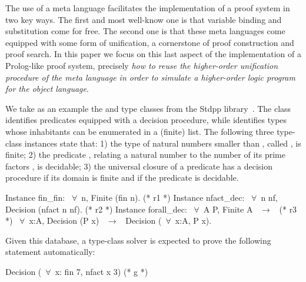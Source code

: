 \documentclass[sigconf,natbib=false,review]{acmart}
\begin{document}
The use of a meta language facilitates the implementation of a
proof system in two key ways. The first and most well-know one is that variable binding and
substitution come for free. %
The second one is that these meta languages come equipped with some form
of unification, a cornerstone of proof construction and proof search.
In this paper we focus on this last aspect of the implementation of
a Prolog-like proof system, precisely \emph{how to reuse the higher-order
unification procedure of the meta language in order to simulate a
higher-order logic program for the object language}.

We take as an example the  and  type classes
from the Stdpp
library~\cite{JUNG_KREBBERS_JOURDAN_BIZJAK_BIRKEDAL_DREYER_2018}.
The class  
identifies predicates equipped with a decision procedure, while
 identifies types whose inhabitants can be enumerated in a (finite) list.
The following three type-class instances state that:
1) the type of natural numbers smaller than , called ,
is finite;
2) the predicate , relating a natural number
 to the number of its prime factors , is decidable;
3) the universal closure of a predicate has a decision procedure if
its domain is finite and if the predicate is decidable.

\begin{coqcode}
Instance fin_fin: ~$\forall$~n, Finite (fin n).             (* r1 *)
Instance nfact_dec: ~$\forall$~n nf, Decision (nfact n nf). (* r2 *)
Instance forall_dec: ~$\forall$~A P, Finite A ~$\to$~            (* r3 *)
  ~$\forall$~x:A, Decision (P x) ~$\to$~ Decision (~$\forall$~x:A, P x).
\end{coqcode}

\noindent Given this database, a type-class solver is expected to
prove the following statement automatically:

\begin{coqcode}
  Decision (~$\forall$~x: fin 7, nfact x 3)                   (* g *)
\end{coqcode}
\end{document}
